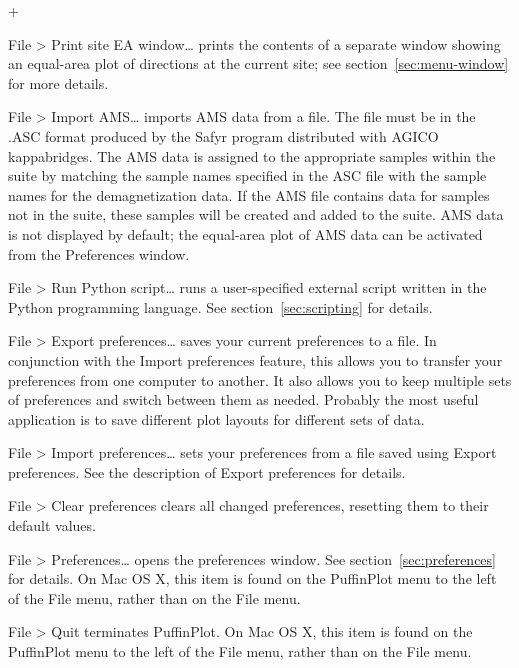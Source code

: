 \documentclass[a4paper,british]{article}
\newcommand{\menuitemlabel}[1]{%
\mbox{\textsf{#1}}\hfil}
\newenvironment{menuitemlist}%
{\begin{list}{}{%
\renewcommand{\makelabel}{\menuitemlabel}%
\setlength{\labelwidth}{35pt}%
\setlength{\leftmargin}%
             {\labelwidth+\labelsep}}}%
{\end{list}}
\newcommand{\ppcmd}[1]{\textsf{#1}} %
\newcommand{\caps}[1]{\MakeTextUppercase{#1}} %
\newcommand{\submenu}{ \textgreater{} } %
\begin{document}
\begin{menuitemlist}
\item[File\submenu Print site EA window\ldots] prints the contents of a
  separate window showing an equal-area plot of directions at the current
  site; see section~\ref{sec:menu-window} for more details.

\item[File\submenu Import AMS\ldots] imports \caps{ams} data from a file. The
  file must be in the \caps{.asc} format produced by the \ppcmd{Safyr}
  program distributed with \caps{Agico} kappabridges. The \caps{ams} data is
  assigned to the appropriate samples within the suite by matching the sample
  names specified in the \caps{asc} file with the sample names for the
  demagnetization data. If the \caps{ams} file contains data for samples not
  in the suite, these samples will be created and added to the suite.
  \caps{Ams} data is not displayed by default; the equal-area plot of
  \caps{ams} data can be activated from the \ppcmd{Preferences} window.

\item[File\submenu Run Python script\ldots] runs a user-specified
  external script written in the Python programming language.
  See section~\ref{sec:scripting} for details.

\item[File\submenu Export preferences\ldots] saves your current preferences
  to a file. In conjunction with the \ppcmd{Import preferences} feature, this
  allows you to transfer your preferences from one computer to another. It
  also allows you to keep multiple sets of preferences and switch between
  them as needed. Probably the most useful application is to save different
  plot layouts for different sets of data.

\item[File\submenu Import preferences\ldots] sets your preferences from a
  file saved using \ppcmd{Export preferences}. See the description of
  \ppcmd{Export preferences} for details.

\item[File\submenu Clear preferences] clears all changed preferences,
  resetting them to their default values.

\item[File\submenu Preferences\ldots] opens the preferences window. See
  section~\ref{sec:preferences} for details. On Mac OS X, this item is found
  on the \ppcmd{PuffinPlot} menu to the left of the \ppcmd{File} menu, rather
  than on the \ppcmd{File} menu.

\item[File\submenu Quit] terminates PuffinPlot. On Mac OS X, this item is
  found on the \ppcmd{PuffinPlot} menu to the left of the \ppcmd{File} menu,
  rather than on the \ppcmd{File} menu.

\end{menuitemlist}
\end{document}
